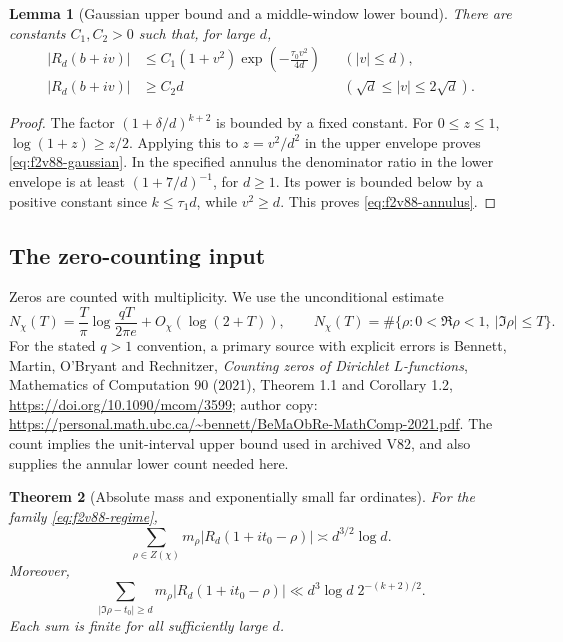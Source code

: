 \documentclass[11pt]{article}
\newtheorem{theorem}{Theorem}[section]
\newtheorem{lemma}[theorem]{Lemma}
\theoremstyle{definition}
\theoremstyle{remark}
\begin{document}
\begin{lemma}[Gaussian upper bound and a middle-window lower bound]
\label{lem:f2v88-window}
There are constants \(C_1,C_2>0\) such that, for large \(d\),
\begin{align}
 |R_d(b+iv)|&\le C_1(1+v^2)
       \exp\left(-\frac{\tau_0v^2}{4d}\right)
       &&(|v|\le d),\label{eq:f2v88-gaussian}\\
 |R_d(b+iv)|&\ge C_2d
       &&(\sqrt d\le |v|\le2\sqrt d).
       \label{eq:f2v88-annulus}
\end{align}
\end{lemma}

\begin{proof}
The factor \((1+\delta/d)^{k+2}\) is bounded by a fixed constant.
For \(0\le z\le1\), \(\log(1+z)\ge z/2\).  Applying this to
\(z=v^2/d^2\) in the upper envelope proves
\eqref{eq:f2v88-gaussian}.  In the specified annulus the denominator
ratio in the lower envelope is at least \((1+7/d)^{-1}\), for
\(d\ge1\).  Its power is bounded below by a positive constant since
\(k\le\tau_1d\), while \(v^2\ge d\).  This proves
\eqref{eq:f2v88-annulus}.
\end{proof}

\subsection{The zero-counting input}

Zeros are counted with multiplicity.  We use the unconditional estimate
\begin{equation}
 N_\chi(T)=\frac{T}{\pi}\log\frac{qT}{2\pi e}
                  +O_\chi(\log(2+T)),
 \qquad N_\chi(T)=\#\{\rho:0<\Re\rho<1,\ |\Im\rho|\le T\}.
 \label{eq:f2v88-count}
\end{equation}
For the stated \(q>1\) convention, a primary source with explicit
errors is Bennett, Martin, O'Bryant and Rechnitzer, \emph{Counting zeros
of Dirichlet \(L\)-functions}, Mathematics of Computation 90 (2021),
Theorem 1.1 and Corollary 1.2,
\url{https://doi.org/10.1090/mcom/3599}; author copy:
\url{https://personal.math.ubc.ca/~bennett/BeMaObRe-MathComp-2021.pdf}.
The count implies the unit-interval upper bound used in archived V82,
and also supplies the annular lower count needed here.

\begin{theorem}[Absolute mass and exponentially small far ordinates]
\label{thm:f2v88-absolute-mass}
For the family \eqref{eq:f2v88-regime},
\begin{equation}
 \sum_{\rho\in Z(\chi)}m_\rho
       |R_d(1+it_0-\rho)|\asymp d^{3/2}\log d.
 \label{eq:f2v88-total}
\end{equation}
Moreover,
\begin{equation}
 \sum_{|\Im\rho-t_0|\ge d}m_\rho
       |R_d(1+it_0-\rho)|
 \ll d^3\log d\;2^{-(k+2)/2}.
 \label{eq:f2v88-far}
\end{equation}
Each sum is finite for all sufficiently large \(d\).
\end{theorem}
\end{document}
